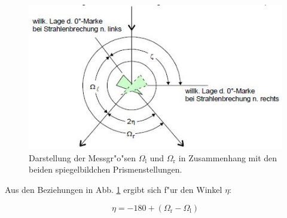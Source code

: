 	\begin{figure}[!h]
		\centering
		\includegraphics[width = 12cm]{img/omega.JPG}
		\caption{Darstellung der Messgr"o"sen $\Omega_\mathrm{l}$ und $\Omega_\mathrm{r}$ in Zusammenhang mit den beiden spiegelbildchen Prismenstellungen. \cite{anleitung}}
		\label{omega}
	\end{figure}

	Aus den Beziehungen in Abb. \ref{omega} ergibt sich f"ur den Winkel $\eta$:

	\begin{equation}
		\eta = - 180 + (\Omega_\mathrm{r} - \Omega_\mathrm{l}) \label{eqn:eta}
	\end{equation}